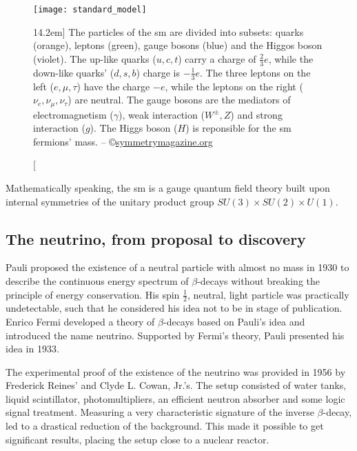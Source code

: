 \begin{figure}
  \centering
  \texttt{[image: standard\_model]}
  \caption[][14.2em]{%
    The particles of the \gls{sm} are divided into subsets:
    quarks (orange), leptons (green), gauge bosons (blue) and the Higgos boson (violet).
    The up-like quarks ($u, c, t$) carry a charge of $\frac{2}{3}e$, while the down-like quarks' ($d, s, b$) charge is $-\frac{1}{3}e$.
    The three leptons on the left ($e, \mu, \tau$) have the charge $-e$, while the leptons on the right ($\nu_e, \nu_\mu, \nu_\tau$) are neutral.
    The gauge bosons are the mediators of electromagnetism ($\gamma$), weak interaction ($W^\pm, Z$) and strong interaction ($g$).
    The Higgs boson ($H$) is reponsible for the \gls{sm} fermions' mass.
    -- \copyright \href{http://www.symmetrymagazine.org/standard-model/}{symmetrymagazine.org}
  }
  \label{fig:standard_model}
\end{figure}

Mathematically speaking, the \gls{sm} is a gauge quantum field theory built upon internal symmetries of the unitary product group $SU(3) \times SU(2) \times U(1)$.

\subsection{The neutrino, from proposal to discovery}
Pauli proposed the existence of a neutral particle with almost no mass in 1930\cite{Brown:1978} to describe the continuous energy spectrum of $\beta$-decays without breaking the principle of energy conservation.
His spin $\frac{1}{2}$, neutral, light particle was practically undetectable, such that he considered his idea not to be in stage of publication.
Enrico Fermi developed a theory of $\beta$-decays based on Pauli's idea and introduced the name neutrino.
Supported by Fermi's theory, Pauli presented his idea in 1933.

The experimental proof of the existence of the neutrino was provided in 1956 by Frederick Reines' and Clyde L. Cowan, Jr.'s.
The setup consisted of water tanks, liquid scintillator, photomultipliers, an efficient neutron absorber and some logic signal treatment.
Measuring a very characteristic signature of the inverse $\beta$-decay, led to a drastical reduction of the background\cite[-2.5em]{Reines:1995:NobelLecture}.
This made it possible to get significant results, placing the setup close to a nuclear reactor.

